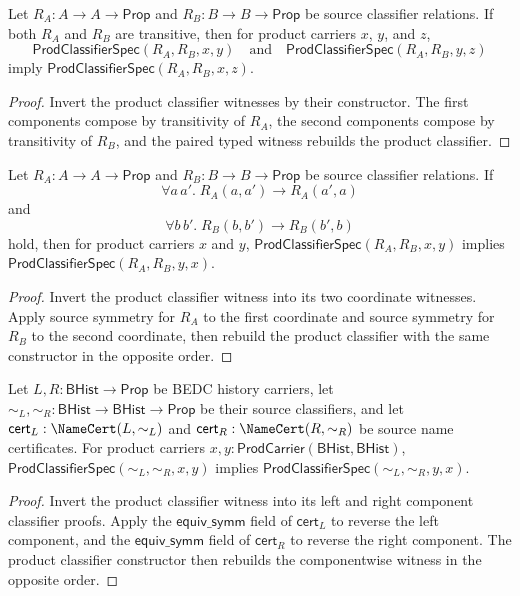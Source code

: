\begin{theorem}
\label{thm:prod-classifier-transitivity}
Let $R_A : A \to A \to \mathsf{Prop}$ and
$R_B : B \to B \to \mathsf{Prop}$ be source classifier relations.  If both
$R_A$ and $R_B$ are transitive, then for product carriers $x$, $y$, and $z$,
$$
  \mathsf{ProdClassifierSpec}(R_A,R_B,x,y)
  \quad\text{and}\quad
  \mathsf{ProdClassifierSpec}(R_A,R_B,y,z)
$$
imply $\mathsf{ProdClassifierSpec}(R_A,R_B,x,z)$.
\end{theorem}
\begin{proof}
Invert the product classifier witnesses by their constructor. The first
components compose by transitivity of $R_A$, the second components compose by
transitivity of $R_B$, and the paired typed witness rebuilds the product
classifier.
\end{proof}

\begin{theorem}
\label{thm:prod-classifier-symm-from-source-symmetry}
Let $R_A : A \to A \to \mathsf{Prop}$ and
$R_B : B \to B \to \mathsf{Prop}$ be source classifier relations. If
$$
\forall a\,a'.\; R_A(a,a')\to R_A(a',a)
$$
and
$$
\forall b\,b'.\; R_B(b,b')\to R_B(b',b)
$$
hold, then for product carriers $x$ and $y$,
$\mathsf{ProdClassifierSpec}(R_A,R_B,x,y)$ implies
$\mathsf{ProdClassifierSpec}(R_A,R_B,y,x)$.
\end{theorem}
\begin{proof}
Invert the product classifier witness into its two coordinate witnesses.
Apply source symmetry for $R_A$ to the first coordinate and source symmetry for
$R_B$ to the second coordinate, then rebuild the product classifier with the
same constructor in the opposite order.
\end{proof}

\begin{theorem}
\label{thm:prod-classifier-symm-from-namecert}
Let $L,R:\mathsf{BHist}\to\mathsf{Prop}$ be BEDC history carriers, let
$\sim_L,\sim_R:\mathsf{BHist}\to\mathsf{BHist}\to\mathsf{Prop}$ be their
source classifiers, and let
$\mathsf{cert}_L:\NameCert(L,\sim_L)$ and
$\mathsf{cert}_R:\NameCert(R,\sim_R)$ be source name certificates. For product
carriers $x,y:\mathsf{ProdCarrier}(\mathsf{BHist},\mathsf{BHist})$,
$\mathsf{ProdClassifierSpec}(\sim_L,\sim_R,x,y)$ implies
$\mathsf{ProdClassifierSpec}(\sim_L,\sim_R,y,x)$.
\end{theorem}
\begin{proof}
Invert the product classifier witness into its left and right component
classifier proofs. Apply the $\mathsf{equiv\_symm}$ field of
$\mathsf{cert}_L$ to reverse the left component, and the
$\mathsf{equiv\_symm}$ field of $\mathsf{cert}_R$ to reverse the right
component. The product classifier constructor then rebuilds the componentwise
witness in the opposite order.
\end{proof}

